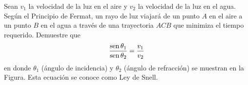 \item Sean $v_1$ la velocidad de la luz en el aire y $v_2$ la velocidad de la luz en el agua. Según el Principio de Fermat, un rayo de luz viajará de un punto $A$ en el aire a un punto $B$ en el agua a través de una trayectoria $ACB$ que minimiza el tiempo requerido. Demuestre que
$$\frac{\operatorname{sen} \theta_1}{\operatorname{sen} \theta_2} = \frac{v_1}{v_2}$$
en donde $\theta_1$ (ángulo de incidencia) y $\theta_2$ (ángulo de refracción) se muestran en la Figura. Esta ecuación se conoce como Ley de Snell.
\begin{center}
\end{center}
